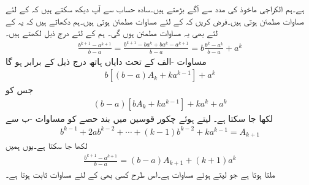 ہے۔ہم الکراجی ماخوذ کی مدد سے آگے بڑھتے ہیں۔سادہ حساب سے آپ دیکھ سکتے ہیں کہ  کے لئے مساوات  مطمئن ہوتی ہیں۔فرض کریں کہ  کے لئے مساوات  مطمئن ہوتی ہیں۔ہم دکھاتے ہیں کہ یہ  کے لئے بھی یہ مساوات مطمئن ہوں گی۔ ہم  کے لئے درج ذیل لکھتے ہیں۔
\begin{align*}
\frac{b^{k+1}-a^{k+1}}{b-a}=\frac{b^{k+1}-ba^k+ba^k-a^{k+1}}{b-a}=b\frac{b^k-a^k}{b-a}+a^k
\end{align*}
مساوات -الف کے تحت دایاں ہاتھ درج ذیل کے برابر ہو گا
\begin{align*}
b[(b-a)A_k+ka^{k-1}]+a^k
\end{align*}
جس کو
\begin{align*}
(b-a)[bA_k+ka^{k-1}]+ka^k+a^k
\end{align*}
لکھا جا سکتا ہے۔ لیتے ہوئے  چکور قوسین میں بند حصے  کو مساوات -ب سے 
\begin{align*}
b^{k-1}+2ab^{k-2}+\cdots+(k-1)b^{k-2}+ka^{k-1}=A_{k+1}
\end{align*}
لکھا جا سکتا ہے۔یوں ہمیں
\begin{align*}
\frac{b^{k+1}-a^{k+1}}{b-a}=(b-a)A_{k+1}+(k+1)a^k
\end{align*}
ملتا ہوتا ہے جو  لیتے ہوئے مساوات  ہے۔اس طرح کسی بھی  کے لئے مساوات  ثابت ہوتا ہے۔


